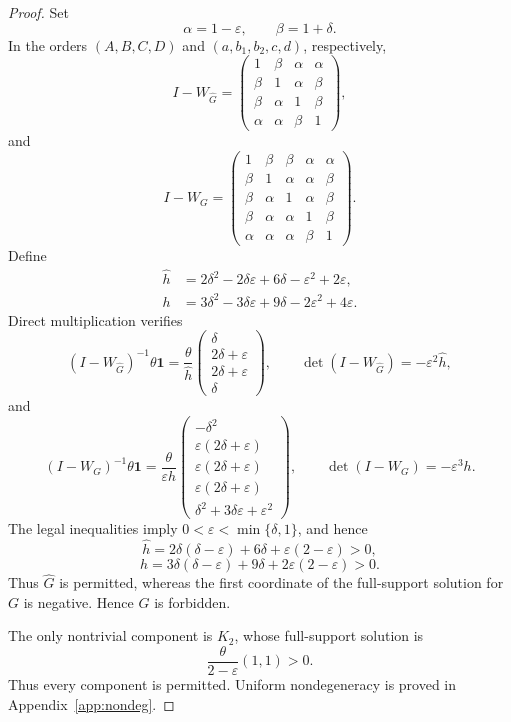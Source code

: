 \documentclass[11pt]{amsart}
\newcommand{\one}{\mathbf{1}}
\newcommand{\eps}{\varepsilon}
\begin{document}
\begin{proof}
Set
\[
\alpha=1-\eps,
\qquad
\beta=1+\delta.
\]
In the orders $(A,B,C,D)$ and $(a,b_1,b_2,c,d)$, respectively,
\[
I-W_{\widehat G}=
\begin{pmatrix}
1&\beta&\alpha&\alpha\\
\beta&1&\alpha&\beta\\
\beta&\alpha&1&\beta\\
\alpha&\alpha&\beta&1
\end{pmatrix},
\]
and
\[
I-W_G=
\begin{pmatrix}
1&\beta&\beta&\alpha&\alpha\\
\beta&1&\alpha&\alpha&\beta\\
\beta&\alpha&1&\alpha&\beta\\
\beta&\alpha&\alpha&1&\beta\\
\alpha&\alpha&\alpha&\beta&1
\end{pmatrix}.
\]
Define
\begin{align*}
\widehat h
&=2\delta^2-2\delta\eps+6\delta-\eps^2+2\eps,\\
h
&=3\delta^2-3\delta\eps+9\delta-2\eps^2+4\eps.
\end{align*}
Direct multiplication verifies
\[
(I-W_{\widehat G})^{-1}\theta\one
=
\frac{\theta}{\widehat h}
\begin{pmatrix}
\delta\\
2\delta+\eps\\
2\delta+\eps\\
\delta
\end{pmatrix},
\qquad
\det(I-W_{\widehat G})=-\eps^2\widehat h,
\]
and
\[
(I-W_G)^{-1}\theta\one
=
\frac{\theta}{\eps h}
\begin{pmatrix}
-\delta^2\\
\eps(2\delta+\eps)\\
\eps(2\delta+\eps)\\
\eps(2\delta+\eps)\\
\delta^2+3\delta\eps+\eps^2
\end{pmatrix},
\qquad
\det(I-W_G)=-\eps^3h.
\]
The legal inequalities imply $0<\eps<\min\{\delta,1\}$, and hence
\[
\widehat h
=2\delta(\delta-\eps)+6\delta+\eps(2-\eps)>0,
\]
\[
h
=3\delta(\delta-\eps)+9\delta+2\eps(2-\eps)>0.
\]
Thus $\widehat G$ is permitted, whereas the first coordinate of the
full-support solution for $G$ is negative. Hence $G$ is forbidden.

The only nontrivial component is $K_2$, whose full-support solution is
\[
\frac{\theta}{2-\eps}(1,1)>0.
\]
Thus every component is permitted. Uniform nondegeneracy is proved in
Appendix~\ref{app:nondeg}.
\end{proof}
\end{document}
